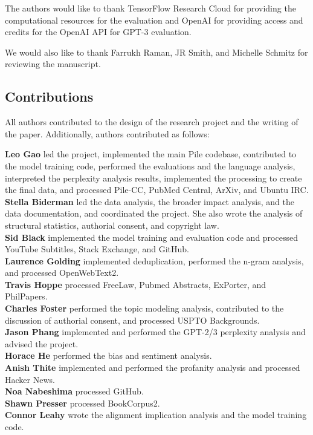 \documentclass[11pt,a4paper]{article}
\begin{document}
The authors would like to thank TensorFlow Research Cloud for providing the computational resources for the evaluation and OpenAI for providing access and credits for the OpenAI API for GPT-3 evaluation.

We would also like to thank Farrukh Raman, JR Smith, and Michelle Schmitz for reviewing the manuscript.




\clearpage

\begin{appendices}

\section{Contributions}\label{apdx:contributions}

All authors contributed to the design of the research project and the writing of the paper. Additionally, authors contributed as follows:

\textbf{Leo Gao} led the project, implemented the main Pile codebase, contributed to the model training code, performed the evaluations and the language analysis, interpreted the perplexity analysis results, implemented the processing to create the final data, and processed Pile-CC, PubMed Central, ArXiv, and Ubuntu IRC.\\
\textbf{Stella Biderman} led the data analysis, the broader impact analysis, and the data documentation, and coordinated the project. She also wrote the analysis of structural statistics, authorial consent, and copyright law.\\
\textbf{Sid Black} implemented the model training and evaluation code and processed YouTube Subtitles, Stack Exchange, and GitHub. \\
\textbf{Laurence Golding} implemented deduplication, performed the n-gram analysis, and processed OpenWebText2. \\
\textbf{Travis Hoppe} processed FreeLaw, Pubmed Abstracts, ExPorter, and PhilPapers. \\
\textbf{Charles Foster} performed the topic modeling analysis, contributed to the discussion of authorial consent, and processed USPTO Backgrounds. \\
\textbf{Jason Phang} implemented and performed the GPT-2/3 perplexity analysis and advised the project. \\
\textbf{Horace He} performed the bias and sentiment analysis. \\
\textbf{Anish Thite} implemented and performed the profanity analysis and processed Hacker News. \\
\textbf{Noa Nabeshima} processed GitHub. \\
\textbf{Shawn Presser} processed BookCorpus2.\\
\textbf{Connor Leahy} wrote the alignment implication analysis and the model training code.


\end{appendices}
\end{document}

